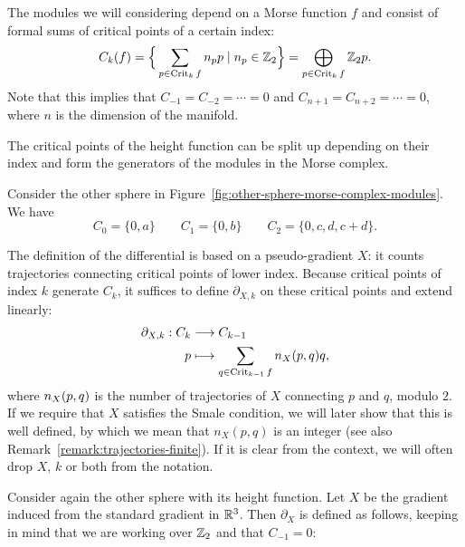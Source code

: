 The modules we will considering depend on a Morse function $f$ and consist of formal sums of critical points of a certain index:
\[
    C_k(f) = \Big\{ \sum_{p \in \operatorname{Crit}_k f} n_p p  \mid n_p \in \mathbb{Z}_2\Big\}  = \bigoplus_{p \in \operatorname{Crit}_k f} \mathbb{Z}_2 p
.\] 
Note that this implies that $C_{-1} = C_{-2} = \cdots = 0$ and $C_{n+1} = C_{n+2} = \cdots = 0$, where $n$ is the dimension of the manifold.


\begin{marginfigure}
    \centering
    \caption{The critical points of the height function can be split up depending on their index and form the generators of the modules in the Morse complex.}
    \label{fig:other-sphere-morse-complex-modules}
\end{marginfigure}

\begin{eg}
    Consider the other sphere in Figure~\ref{fig:other-sphere-morse-complex-modules}. We have
    \[
    C_0 = \{0, a\}  \qquad C_1 = \{0, b\}  \qquad C_2 = \{0, c, d, c+d\} 
    .\] 
\end{eg}

The definition of the differential is based on a pseudo-gradient $X$: it counts trajectories connecting critical points of lower index.
Because critical points of index $k$ generate $C_k$, it suffices to define $\partial_{X,k}$ on these critical points and extend linearly:
\begin{align*}
    \partial_{X, k}: C_k &\longrightarrow C_{k-1} \\
    p &\longmapsto \sum_{q \in \operatorname{Crit}_{k-1} f} n_{X}(p, q) q
,\end{align*}
where $n_{X}(p, q)$ is the number of trajectories of $X$ connecting $p$ and $q$, modulo $2$.
If we require that $X$ satisfies the Smale condition, we will later show that this is well defined, by which we mean that $n_X(p,q)$ is an integer (see also Remark~\ref{remark:trajectories-finite}).
If it is clear from the context, we will often drop $X$, $k$ or both from the notation.
\begin{eg}
    Consider again the other sphere with its height function.
    Let $X$ be the gradient induced from the standard gradient in $\mathbb{R}^3$.
    Then $\partial_X$ is defined as follows, keeping in mind that we are working over $\mathbb{Z}_2$ and that $C_{-1} = 0$:
\begin{figure}[H]
    \centering
\end{figure}
\end{eg}

